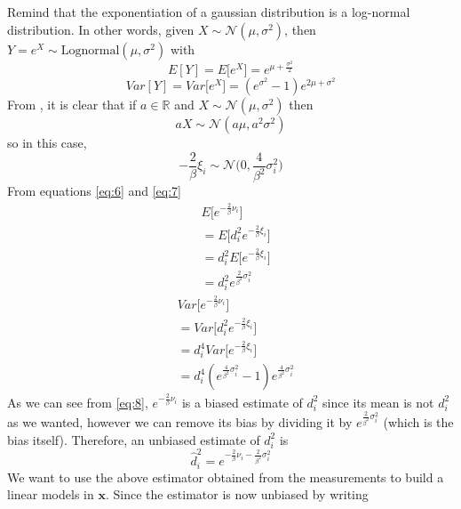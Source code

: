 \documentclass[12pt,twoside]{report}
\begin{document}
Remind that the exponentiation of a gaussian distribution is \cite{Beran2011} a log-normal distribution. In other words, given $X\sim \mathcal{N}(\mu,\sigma^2)$, then $Y=e^X\sim \text{Lognormal}(\mu,\sigma^2)$ with
\begin{equation}
    E[Y]=E\big[e^X\big]=e^{\mu+\frac{\sigma^2}{2}}
    \label{eq:6}
\end{equation}
\begin{equation}
    Var[Y]=Var\big[e^X\big]=(e^{\sigma^2}-1)e^{2\mu+\sigma^2}
    \label{eq:7}
\end{equation}
From \cite{alma9926534668905776}, it is clear that if $a\in \mathbb{R}$ and $X\sim \mathcal{N}(\mu,\sigma^2)$ then
\begin{equation}
aX\sim \mathcal{N}(a\mu,a^2\sigma^2)    
\end{equation}
so in this case, 
\begin{equation}
    -\frac{2}{\beta}\xi_i\sim \mathcal{N}\bigg(0,\frac{4}{\beta^2}\sigma^2_i\bigg)
\end{equation}
From equations \ref{eq:6} and \ref{eq:7}
\begin{align}
    &E\bigg[e^{-\frac{2}{\beta}\nu_i}\bigg]\\
    &=E\bigg[d_i^2e^{-\frac{2}{\beta}\xi_i}\bigg]\\
    &=d_i^2E\bigg[e^{-\frac{2}{\beta}\xi_i}\bigg]\\ &=d_i^2e^{\frac{2}{\beta^2}\sigma^2_i}
    \label{eq:8}
\end{align}
\begin{align}
    &Var\bigg[e^{-\frac{2}{\beta}\nu_i}\bigg]\\
    &=Var\bigg[d_i^2e^{-\frac{2}{\beta}\xi_i}\bigg]\\
    &=d_i^4Var\bigg[e^{-\frac{2}{\beta}\xi_i}\bigg]\\
    &=d_i^4(e^{\frac{4}{\beta^2}\sigma_i^2}-1)e^{\frac{4}{\beta^2}\sigma^2_i}
\end{align}
As we can see from \ref{eq:8}, $e^{-\frac{2}{\beta}\nu_i}$ is a biased estimate of $d_i^2$ since its mean is not $d_i^2$ as we wanted, however we can remove its bias by dividing it by $e^{\frac{2}{\beta^2}\sigma^2_i}$ (which is the bias itself). Therefore, an unbiased estimate of $d_i^2$ is 
\begin{equation}
    \hat{d}_i^2=e^{-\frac{2}{\beta}\nu_i-\frac{2}{\beta^2}\sigma^2_i}
    \label{eq:9}
\end{equation}
We want to use the above estimator obtained from the measurements to build a linear models in $\mathbf{x}$. Since the estimator is now unbiased by writing 
\end{document}
